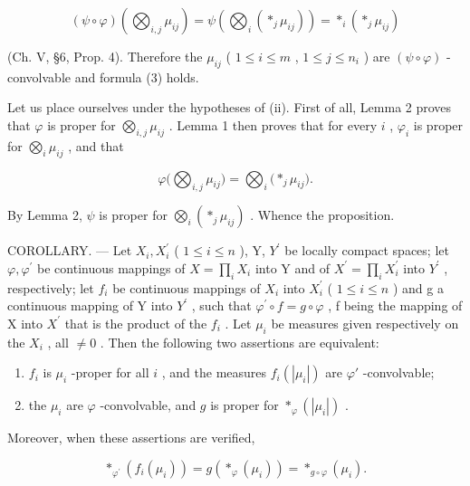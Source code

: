 \[
(\psi \circ \varphi) \left(\bigotimes_ {i, j} \mu_ {i j}\right) = \psi \left(\bigotimes_ {i} \left(* _ {j} \mu_ {i j}\right)\right) = * _ {i} \left(* _ {j} \mu_ {i j}\right)
\]

(Ch. V, §6, Prop. 4). Therefore the \(\mu_{ij}\) ( \(1 \leqslant i \leqslant m\) , \(1 \leqslant j \leqslant n_i\) ) are \((\psi \circ \varphi)\) -convolvable and formula (3) holds.

Let us place ourselves under the hypotheses of (ii). First of all, Lemma 2 proves that \(\varphi\) is proper for \(\bigotimes_{i,j} \mu_{ij}\) . Lemma 1 then proves that for every \(i\) , \(\varphi_i\) is proper for \(\bigotimes_{i} \mu_{ij}\) , and that

\[
\varphi \Big (\bigotimes_ {i, j} \mu_ {i j} \Big) = \bigotimes_ {i} \Big (* _ {j} \mu_ {i j} \Big).
\]

By Lemma 2, \(\psi\) is proper for \(\bigotimes_{i}\left(*_{j}\mu_{ij}\right)\) . Whence the proposition.

COROLLARY. --- Let \(X_{i}, X_{i}^{\prime}\) ( \(1 \leqslant i \leqslant n\) ), Y, \(Y^{\prime}\) be locally compact spaces; let \(\varphi, \varphi^{\prime}\) be continuous mappings of \(X = \prod_{i} X_{i}\) into Y and of \(X^{\prime} = \prod_{i} X_{i}^{\prime}\) into \(Y^{\prime}\) , respectively; let \(f_{i}\) be continuous mappings of \(X_{i}\) into \(X_{i}^{\prime}\) ( \(1 \leqslant i \leqslant n\) ) and g a continuous mapping of Y into \(Y^{\prime}\) , such that \(\varphi^{\prime} \circ f = g \circ \varphi\) , f being the mapping of X into \(X^{\prime}\) that is the product of the \(f_{i}\) . Let \(\mu_{i}\) be measures given respectively on the \(X_{i}\) , all \(\neq 0\) . Then the following two assertions are equivalent:

\begin{enumerate}
\def\labelenumi{(\roman{enumi})}
\item
  \(f_{i}\) is \(\mu_{i}\) -proper for all \(i\) , and the measures \(f_{i}(|\mu_{i}|)\) are \(\varphi'\) -convolvable;
\item
  the \(\mu_{i}\) are \(\varphi\) -convolvable, and \(g\) is proper for \(*_{\varphi}(|\mu_i|)\) .
\end{enumerate}

Moreover, when these assertions are verified,

\[
\left. \ast_ {\varphi^ {\prime}} \left(f _ {i} \left(\mu_ {i}\right)\right) = g \left(\ast_ {\varphi} \left(\mu_ {i}\right)\right) = \ast_ {g \circ \varphi} \left(\mu_ {i}\right). \right.\tag{4}
\]

